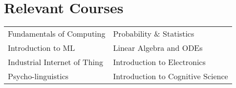\section*{\sc Relevant Courses}
\vspace{-2mm}
\hrulefill
\vspace{1mm}

\begin{tabular}{ l l }
Fundamentals of Computing & Probability \& Statistics \\
Introduction to ML & Linear Algebra and ODEs \\
 Industrial Internet of Thing  & Introduction to Electronics \\ 
Psycho-linguistics  & Introduction to Cognitive Science \\ 
\end{tabular}

